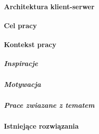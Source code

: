 \paragraph{Architektura klient-serwer}

\paragraph{Cel pracy}

\paragraph{Kontekst pracy}

\subparagraph{Inspiracje}

\subparagraph{Motywacja}

\subparagraph{Prace zwiazane z tematem}

\paragraph{Istniejące rozwiązania}




